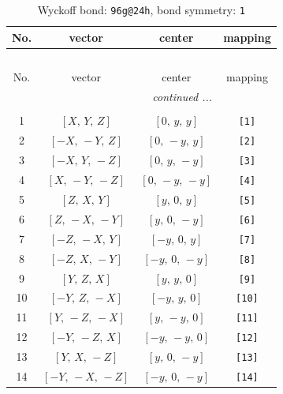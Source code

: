 \documentclass[fleqn,8pt]{jsarticle}
\begin{document}
\begin{longtable}{cccc}
\caption{Wyckoff bond: {\tt 96g@24h}, bond symmetry: {\tt 1}}
 \\
 \hline \hline
No. & vector & center & mapping \\ \hline \endfirsthead

\multicolumn{3}{l}{\tablename\ \thetable{}} \\
 \hline \hline
No. & vector & center & mapping \\ \hline \endhead

 \hline \hline
\multicolumn{3}{r}{\footnotesize\it continued ...} \\ \endfoot

 \hline \hline
\multicolumn{3}{r}{} \\ \endlastfoot

1 & $\left[ X,\, Y,\, Z \right]$ & $\left[ 0,\, y,\, y \right]$ & {\tt [1]} \\ \hline
2 & $\left[ - X,\, - Y,\, Z \right]$ & $\left[ 0,\, - y,\, y \right]$ & {\tt [2]} \\ \hline
3 & $\left[ - X,\, Y,\, - Z \right]$ & $\left[ 0,\, y,\, - y \right]$ & {\tt [3]} \\ \hline
4 & $\left[ X,\, - Y,\, - Z \right]$ & $\left[ 0,\, - y,\, - y \right]$ & {\tt [4]} \\ \hline
5 & $\left[ Z,\, X,\, Y \right]$ & $\left[ y,\, 0,\, y \right]$ & {\tt [5]} \\ \hline
6 & $\left[ Z,\, - X,\, - Y \right]$ & $\left[ y,\, 0,\, - y \right]$ & {\tt [6]} \\ \hline
7 & $\left[ - Z,\, - X,\, Y \right]$ & $\left[ - y,\, 0,\, y \right]$ & {\tt [7]} \\ \hline
8 & $\left[ - Z,\, X,\, - Y \right]$ & $\left[ - y,\, 0,\, - y \right]$ & {\tt [8]} \\ \hline
9 & $\left[ Y,\, Z,\, X \right]$ & $\left[ y,\, y,\, 0 \right]$ & {\tt [9]} \\ \hline
10 & $\left[ - Y,\, Z,\, - X \right]$ & $\left[ - y,\, y,\, 0 \right]$ & {\tt [10]} \\ \hline
11 & $\left[ Y,\, - Z,\, - X \right]$ & $\left[ y,\, - y,\, 0 \right]$ & {\tt [11]} \\ \hline
12 & $\left[ - Y,\, - Z,\, X \right]$ & $\left[ - y,\, - y,\, 0 \right]$ & {\tt [12]} \\ \hline
13 & $\left[ Y,\, X,\, - Z \right]$ & $\left[ y,\, 0,\, - y \right]$ & {\tt [13]} \\ \hline
14 & $\left[ - Y,\, - X,\, - Z \right]$ & $\left[ - y,\, 0,\, - y \right]$ & {\tt [14]} \\ \hline

\end{longtable}
\end{document}
